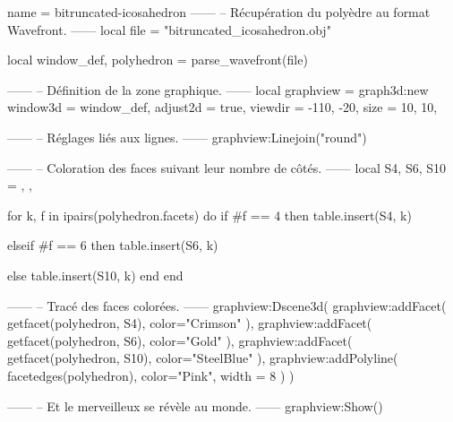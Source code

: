 \documentclass{standalone}
\begin{document}
\begin{luadraw}{name = bitruncated-icosahedron}
------
-- Récupération du polyèdre au format Wavefront.
------
local file = "bitruncated_icosahedron.obj"

local window_def, polyhedron = parse_wavefront(file)

------
-- Définition de la zone graphique.
------
local graphview = graph3d:new{
  window3d = window_def,
  adjust2d = true,
  viewdir  = {-110, -20},
  size     = {10, 10},
}

------
-- Réglages liés aux lignes.
------
graphview:Linejoin("round")

------
-- Coloration des faces suivant leur nombre de côtés.
------
local S4, S6, S10 = {}, {}, {}

for k, f in ipairs(polyhedron.facets) do
  if #f == 4 then
    table.insert(S4, k)

  elseif #f == 6 then
    table.insert(S6, k)

  else
    table.insert(S10, k)
  end
end

------
-- Tracé des faces colorées.
------
graphview:Dscene3d(
  graphview:addFacet(
    getfacet(polyhedron, S4),
    {
      color="Crimson"
    }),
  graphview:addFacet(
    getfacet(polyhedron, S6),
    {
      color="Gold"
    }),
  graphview:addFacet(
    getfacet(polyhedron, S10),
    {
      color="SteelBlue"
    }),
  graphview:addPolyline(
    facetedges(polyhedron),
    {
      color="Pink",
      width = 8
    })
)

------
-- Et le merveilleux se révèle au monde.
------
graphview:Show()
\end{luadraw}
\end{document}
